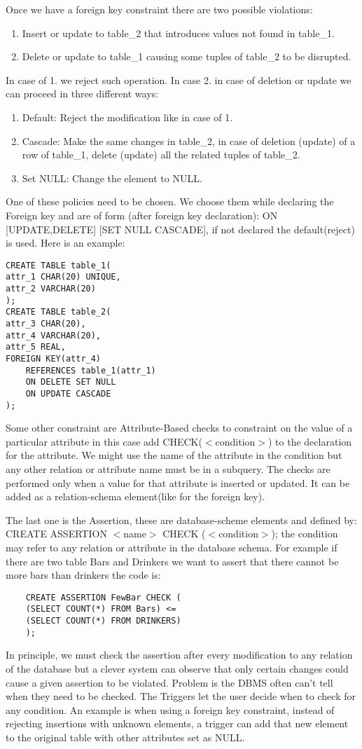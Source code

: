 \documentclass[a4page, 11pt]{article}
\begin{document}
Once we have a foreign key constraint there are two possible violations:
\begin{enumerate}
	\item Insert or update to table\_2 that introduces values not found in table\_1.
	\item Delete or update to table\_1 causing some tuples of table\_2 to be disrupted.
\end{enumerate}
In case of 1. we reject such operation. In case 2. in case of deletion or update we can proceed in three different ways:
\begin{enumerate}
	\item Default: Reject the modification like in case of 1.
	\item Cascade: Make the same changes in table\_2, in case of deletion (update) of a row of table\_1, delete (update) all the related tuples of table\_2.
	\item Set NULL: Change the element to NULL.
\end{enumerate}
One of these policies need to be chosen. We choose them while declaring the Foreign key and are of form (after foreign key declaration): ON [UPDATE,DELETE] [SET NULL CASCADE], if not declared the default(reject) is used. Here is an example:
\begin{lstlisting}
CREATE TABLE table_1(
attr_1 CHAR(20) UNIQUE,
attr_2 VARCHAR(20)
);
CREATE TABLE table_2(
attr_3 CHAR(20),
attr_4 VARCHAR(20),
attr_5 REAL,
FOREIGN KEY(attr_4)
	REFERENCES table_1(attr_1)
	ON DELETE SET NULL
	ON UPDATE CASCADE
);
\end{lstlisting}

Some other constraint are Attribute-Based checks to constraint on the value of a particular attribute in this case add CHECK($<$condition$>$) to the declaration for the attribute. We might use the name of the attribute in the condition but any other relation or attribute name must be in a subquery.
The checks are performed only when a value for that attribute is inserted or updated.
It can be added as a relation-schema element(like for the foreign key).

The last one is the Assertion, these are database-scheme elements and defined by: \newline CREATE ASSERTION $<$name$>$ CHECK ($<$condition$>$); the condition may refer to any relation or attribute in the database schema.
For example if there are two table Bars and Drinkers we want to assert that there cannot be more bars than drinkers the code is:
\begin{lstlisting}
	CREATE ASSERTION FewBar CHECK (
	(SELECT COUNT(*) FROM Bars) <=
	(SELECT COUNT(*) FROM DRINKERS)
	);
\end{lstlisting}
In principle, we must check the assertion after every modification to any relation of the database but a clever system can observe that only certain changes could cause a given assertion to be violated. 
Problem is the DBMS often can't tell when they need to be checked. 
The Triggers let the user decide when to check for any condition.
An example is when using a foreign key constraint, instead of rejecting insertions with unknown elements, a trigger can add that new element to the original table with other attributes set as NULL.
\end{document}
